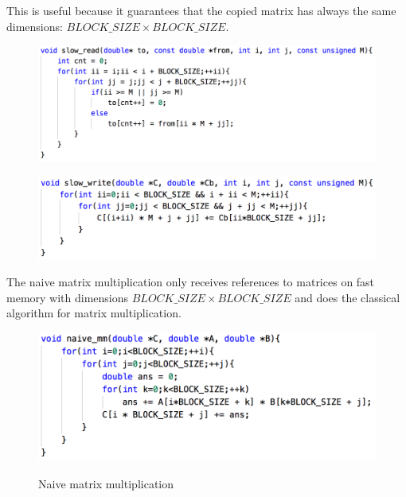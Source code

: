 \documentclass[unicode,11pt,a4paper,oneside,numbers=endperiod,openany]{scrartcl}
\begin{document}
\begin{enumerate}
            This is useful because it guarantees that the copied matrix has always the same dimensions: $BLOCK\_SIZE \times BLOCK\_SIZE$.

            \begin{figure}[H]
                \begin{minipage}{.48\textwidth}
                    \centering
                    \includegraphics[width=\linewidth]{./img/load}
                    \label{load}
                \end{minipage}%
                \hfill
                \begin{minipage}{.48\textwidth}
                    \centering
                    \includegraphics[width=\linewidth]{./img/write}
                    \label{write}
                \end{minipage}
            \end{figure}

        The naive matrix multiplication only receives references to matrices on fast memory with dimensions $BLOCK\_SIZE \times BLOCK\_SIZE$ and does the classical algorithm for matrix multiplication.

            \begin{figure}[H]
                \includegraphics[width=\linewidth]{./img/naive}
                \label{naive}
                \caption{Naive matrix multiplication}
            \end{figure}


\end{enumerate}
\end{document}
